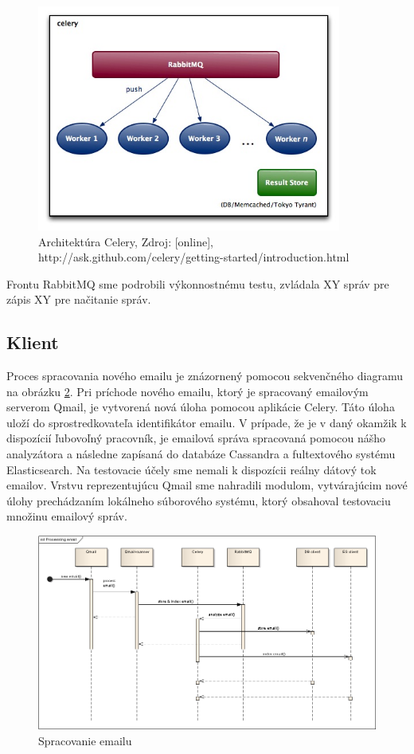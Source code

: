 \documentclass[11pt,twoside,a4paper]{book}
\begin{document}
\begin{figure}[h]
 \centering
 \includegraphics[width=10cm]{./figures/Celery.jpg}
 \caption{Architektúra Celery, Zdroj: [online], http://ask.github.com/celery/getting-started/introduction.html}
 \label{fig:Celery}
\end{figure}

Frontu RabbitMQ sme podrobili výkonnostnému testu, zvládala XY správ pre zápis XY pre načitanie správ.

\subsection{Klient}

Proces spracovania nového emailu je znázornený pomocou sekvenčného diagramu na obrázku \ref{fig:Cseq}. Pri príchode nového emailu, ktorý je spracovaný emailovým serverom Qmail, je vytvorená nová úloha pomocou aplikácie Celery. Táto úloha uloží do sprostredkovateľa identifikátor emailu. V prípade, že je v daný okamžik k dispozícií ľubovoľný pracovník, je emailová správa spracovaná pomocou nášho analyzátora a následne zapísaná do databáze Cassandra a fultextového systému Elasticsearch. Na testovacie účely sme nemali k dispozícii reálny dátový tok emailov. Vrstvu reprezentujúcu Qmail sme nahradili modulom, vytvárajúcim nové úlohy prechádzaním lokálneho súborového systému, ktorý obsahoval testovaciu množinu emailový správ.


\begin{figure}[h]
 \centering
 \includegraphics[width=16cm]{./figures/emailProcessing.png}
 \caption{Spracovanie emailu}
 \label{fig:Cseq}
\end{figure}
\end{document}
